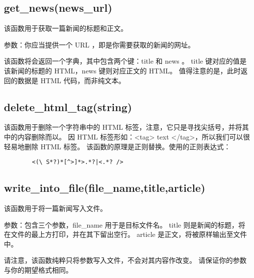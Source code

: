 \documentclass{article}
\begin{document}
    \subsection{get\_news(news\_url)}
    该函数用于获取一篇新闻的标题和正文。
    \par
    参数：你应当提供一个 URL ，即是你需要获取的新闻的网址。
    \par
    该函数将会返回一个字典，其中包含两个键：title 和 news 。
    title 键对应的值是该新闻的标题的 HTML，news 键则对应正文的 HTML。
    值得注意的是，此时返回的数据是 HTML 代码，而非纯文本。
    \subsection{delete\_html\_tag(string)}
    该函数用于删除一个字符串中的 HTML 标签，注意，它只是寻找尖括号，并将其中的内容删除而以。
    因 HTML 标签形如：<tag> text </tag>，所以我们可以很轻易地删除 HTML 标签。
    该函数的原理是正则替换。使用的正则表达式：
    \begin{lstlisting}
        <(\ S*?)*[^>]*>.*?|<.*? />
    \end{lstlisting}
    \subsection{write\_into\_file(file\_name,title,article)}
    该函数用于将一篇新闻写入文件。
    \par
    参数：包含三个参数，file\_name 用于是目标文件名。
    title 则是新闻的标题，将在文件的最上方打印，并在其下留出空行。
    article 是正文，将被原样输出至文件中。
    \par
    请注意，该函数纯粹只将参数写入文件，不会对其内容作改变。
    请保证你的参数与你的期望格式相同。
\end{document}
